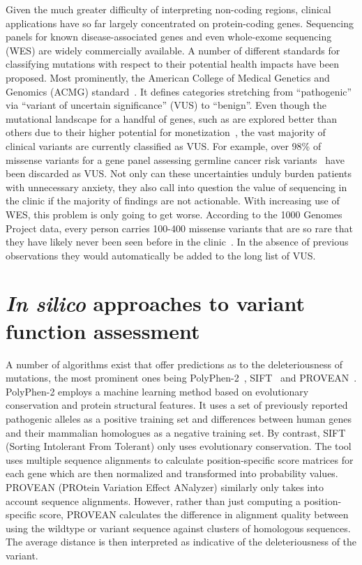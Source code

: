 Given the much greater difficulty of interpreting non-coding regions, clinical applications have so far largely concentrated on protein-coding genes. Sequencing panels for known disease-associated genes and even whole-exome sequencing (WES) are widely commercially available. A number of different standards for classifying mutations with respect to their potential health impacts have been proposed. Most prominently, the American College of Medical Genetics and Genomics (ACMG) standard~\cite{richards_standards_2015}. %
It defines categories stretching from ``pathogenic'' via ``variant of uncertain significance'' (VUS) to ``benign''. Even though the mutational landscape for a handful of genes, such as  are explored better than others due to their higher potential for monetization~\cite{cheon_variants_2014}, the vast majority of clinical variants are currently classified as VUS. For example, over 98\% of missense variants for a gene panel assessing germline cancer risk variants~\cite{maxwell_evaluation_2016} have been discarded as VUS. Not only can these uncertainties unduly burden patients with unnecessary anxiety, they also call into question the value of sequencing in the clinic if the majority of findings are not actionable. With increasing use of WES, this problem is only going to get worse. According to  the 1000 Genomes Project data, every person carries 100-400 missense variants that are so rare that they have likely never been seen before in the clinic~\cite{the_1000_genomes_project_consortium_global_2015}. In the absence of previous observations they would automatically be added to the long list of VUS.

\section{\textit{In silico} approaches to variant function assessment}
\label{insilicoIntro}

A number of algorithms exist that offer predictions as to the deleteriousness of mutations, the most prominent ones being PolyPhen-2~\cite{adzhubei_predicting_2001}, SIFT~\cite{ng_predicting_2001} and PROVEAN~\cite{choi_predicting_2012}. PolyPhen-2 employs a machine learning method based on evolutionary conservation and protein structural features. It uses a set of previously reported pathogenic alleles as a positive training set and differences between human genes and their mammalian homologues as a negative training set. By contrast, SIFT (Sorting Intolerant From Tolerant) only uses evolutionary conservation. The tool uses multiple sequence alignments to calculate position-specific score matrices for each gene which are then normalized and transformed into probability values. PROVEAN (PROtein Variation Effect ANalyzer) similarly only takes into account sequence alignments. However, rather than just computing a position-specific score, PROVEAN calculates the difference in alignment quality between using the wildtype or variant sequence against clusters of homologous sequences. The average distance is then interpreted as indicative of the deleteriousness of the variant. 

